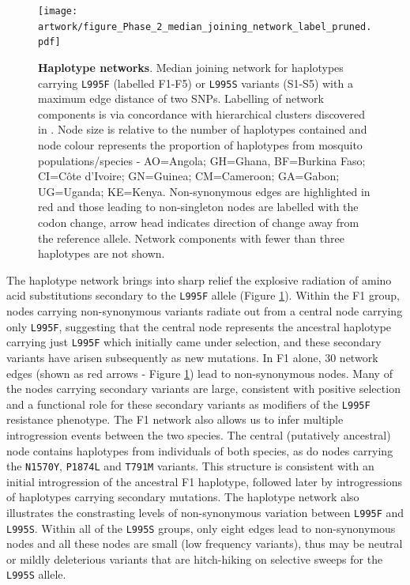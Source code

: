 \documentclass[a4paper,11pt,abstracton,hidelinks]{scrartcl}
\begin{document}
%
\begin{figure}[!t]
  \texttt{[image: artwork/figure\_Phase\_2\_median\_joining\_network\_label\_pruned.pdf]}
  \caption{\textbf{Haplotype networks}. Median joining network for haplotypes carrying \texttt{L995F} (labelled F1-F5) or \texttt{L995S} variants (S1-S5) with a maximum edge distance of two SNPs. Labelling of network components is via concordance with hierarchical clusters discovered in \cite{Ag1000gConsortium2017}. Node size is relative to the number of haplotypes contained and node colour represents the proportion of haplotypes from mosquito populations/species - AO=Angola; GH=Ghana, BF=Burkina Faso; CI=C\^{o}te d'Ivoire; GN=Guinea; CM=Cameroon; GA=Gabon; UG=Uganda; KE=Kenya. Non-synonymous edges are highlighted in red and those leading to non-singleton nodes are labelled with the codon change, arrow head indicates direction of change away from the reference allele. Network components with fewer than three haplotypes are not shown.}
  \label{fig:networks}
\end{figure}


%
The haplotype network brings into sharp relief the explosive radiation of amino acid substitutions secondary to the \texttt{L995F} allele (Figure \ref{fig:networks}).
%
Within the F1 group, nodes carrying non-synonymous variants radiate out from a central node carrying only \texttt{L995F}, suggesting that the central node represents the ancestral haplotype carrying just \texttt{L995F} which initially came under selection, and these secondary variants have arisen subsequently as new mutations.
%
In F1 alone, 30 network edges (shown as red arrows - Figure \ref{fig:networks}) lead to non-synonymous nodes.
%
Many of the nodes carrying secondary variants are large, consistent with positive selection and a functional role for these secondary variants as modifiers of the \texttt{L995F} resistance phenotype.
%
The F1 network also allows us to infer multiple introgression events between the two species.
%
The central (putatively ancestral) node contains haplotypes from individuals of both species, as do nodes carrying the \texttt{N1570Y}, \texttt{P1874L} and \texttt{T791M} variants.
%
This structure is consistent with an initial introgression of the ancestral F1 haplotype, followed later by introgressions of haplotypes carrying secondary mutations.
%
The haplotype network also illustrates the constrasting levels of non-synonymous variation between \texttt{L995F} and \texttt{L995S}.
%
Within all of the \texttt{L995S} groups, only eight edges lead to non-synonymous nodes and all these nodes are small (low frequency variants), thus may be neutral or mildly deleterious variants that are hitch-hiking on selective sweeps for the \texttt{L995S} allele.
\end{document}
